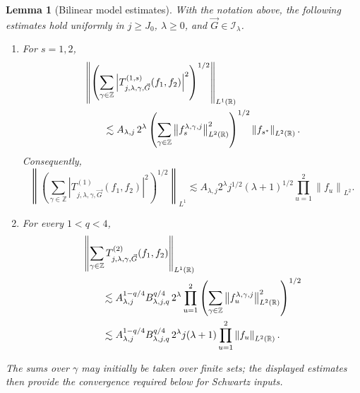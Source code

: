 \documentclass[11pt]{amsart}
\newtheorem{lemma}[definition]{Lemma}
\theoremstyle{remark}
\numberwithin{equation}{section}
\newcommand{\R}{\mathbb R}
\newcommand{\cI}{\mathcal I}
\newcommand{\norm}[1]{\left\lVert #1\right\rVert}
\begin{document}
	\begin{lemma}[Bilinear model estimates]
		\label{lem:GHHP-specialized}
		With the notation above, the following estimates hold uniformly in
		\(j\ge J_0\), \(\lambda\ge0\), and
		\(\vec G\in\cI_\lambda\).
		\begin{enumerate}
			\item For \(s=1,2\),
			\begin{align}
				&\left\|
				\left(
				\sum_{\gamma\in\mathbb Z}
				\left|T_{j,\lambda,\gamma,\vec G}^{(1,s)}(f_1,f_2)\right|^2
				\right)^{1/2}
				\right\|_{L^1(\R)}
				\notag\\
				&\qquad\lesssim
				A_{\lambda,j}\,2^\lambda
				\left(
				\sum_{\gamma\in\mathbb Z}
				\norm{f_s^{\lambda,\gamma,j}}_{L^2(\R)}^2
				\right)^{1/2}
				\norm{f_{s^\ast}}_{L^2(\R)}.
				\label{eq:GHHP-one-large}
			\end{align}
			Consequently,
			\begin{equation}
				\left\|
				\left(
				\sum_{\gamma\in\mathbb Z}
				\left|T_{j,\lambda,\gamma,\vec G}^{(1)}(f_1,f_2)\right|^2
				\right)^{1/2}
				\right\|_{L^1}
				\lesssim
				A_{\lambda,j}2^\lambda
				j^{1/2}(\lambda+1)^{1/2}
				\prod_{u=1}^2\norm{f_u}_{L^2}.
				\label{eq:unbal-vector}
			\end{equation}
			
			\item For every \(1<q<4\),
			\begin{align}
				&\left\|
				\sum_{\gamma\in\mathbb Z}
				T_{j,\lambda,\gamma,\vec G}^{(2)}(f_1,f_2)
				\right\|_{L^1(\R)}
				\notag\\
				&\qquad\lesssim
				A_{\lambda,j}^{1-q/4}B_{\lambda,j,q}^{q/4}
				\,2^\lambda
				\prod_{u=1}^2
				\left(
				\sum_{\gamma\in\mathbb Z}
				\norm{f_u^{\lambda,\gamma,j}}_{L^2(\R)}^2
				\right)^{1/2}
				\notag\\
				&\qquad\lesssim
				A_{\lambda,j}^{1-q/4}B_{\lambda,j,q}^{q/4}
				\,2^\lambda j(\lambda+1)
				\prod_{u=1}^2\norm{f_u}_{L^2(\R)}.
				\label{eq:GHHP-two-large}
			\end{align}
		\end{enumerate}
		The sums over \(\gamma\) may initially be taken over finite sets; the
		displayed estimates then provide the convergence required below for
		Schwartz inputs.
	\end{lemma}
	
\end{document}
